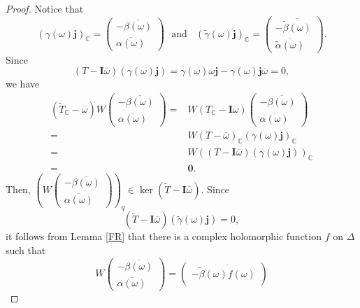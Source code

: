 \documentclass[pdflatex,sn-mathphys-num]{sn-jnl}%
\theoremstyle{thmstyleone}%
\theoremstyle{thmstyletwo}%
\theoremstyle{thmstylethree}%
\theoremstyle{definition}
\theoremstyle{remark}
\begin{document}
\begin{proof}
Notice that
\[
(\gamma(\omega)\boldsymbol{j})_{\mathbb{C}}=\begin{pmatrix}
	-\overline{\beta(\omega)} \\
	\overline{\alpha(\omega)}
\end{pmatrix} \ \ \ \text{and} \ \ \ \ (\widetilde{\gamma}(\omega)\boldsymbol{j})_{\mathbb{C}}=\begin{pmatrix}
-\overline{\widetilde{\beta}(\omega)} \\
\overline{\widetilde{\alpha}(\omega)}
\end{pmatrix}.
\]
Since
\[
({T}-\boldsymbol{I}\overline{\omega})(\gamma(\omega)\boldsymbol{j})=\gamma(\omega)\omega\boldsymbol{j}-\gamma(\omega)\boldsymbol{j}\overline{\omega}=0,
\]
we have
    $$
    \begin{aligned}
  (\widetilde{T}_{{\mathbb{C}}}-\overline{\omega})W\begin{pmatrix}
-\overline{\beta(\omega)} \\
\overline{\alpha(\omega)}
\end{pmatrix}
	= & W({T}_{\mathbb{C}}-\boldsymbol{I}\overline{\omega})\begin{pmatrix}
		-\overline{\beta(\omega)} \\
		\overline{\alpha(\omega)}
	\end{pmatrix} \\
	= & W({T}-\overline{\omega})_{\mathbb{C}}(\gamma(\omega)\boldsymbol{j})_{\mathbb{C}} \\
	= & W(({T}-\boldsymbol{I}\overline{\omega})(\gamma(\omega)\boldsymbol{j}))_{\mathbb{C}} \\
	= & \boldsymbol{0}.
\end{aligned}
$$
Then, $\left( W\begin{pmatrix}
	-\overline{\beta(\omega)} \\
	\overline{\alpha(\omega)}
\end{pmatrix} \right)_q\in\ker(\widetilde{T}-\boldsymbol{I}\overline{\omega})$. Since
\[
(\widetilde{T}-\boldsymbol{I}\overline{\omega})(\widetilde{\gamma}(\omega)\boldsymbol{j})=0,
\]
it follows from Lemma \ref{FR} that there is a complex holomorphic function $f$ on $\Delta$ such that
    $$
    W\begin{pmatrix}
    	-\overline{\beta(\omega)} \\
    	\overline{\alpha(\omega)}
    \end{pmatrix}
    =\begin{pmatrix}
    	-\overline{\widetilde{\beta}(\omega)f(\omega)} \\

\end{pmatrix}$$
\end{proof}
\end{document}
